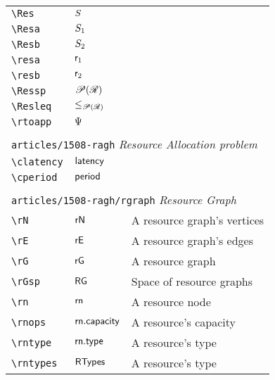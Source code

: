 \begin{longtable}{lll}
 {\color[rgb]{0.5,0.5,0.5}\texttt{\textbackslash Res}} & $S$ & \\ 
 {\color[rgb]{0.5,0.5,0.5}\texttt{\textbackslash Resa}} & $S_1$ & \\ 
 {\color[rgb]{0.5,0.5,0.5}\texttt{\textbackslash Resb}} & $S_2$ & \\ 
 {\color[rgb]{0.5,0.5,0.5}\texttt{\textbackslash resa}} & $\mathsf{r}_1$ & \\ 
 {\color[rgb]{0.5,0.5,0.5}\texttt{\textbackslash resb}} & $\mathsf{r}_2$ & \\ 
 {\color[rgb]{0.5,0.5,0.5}\texttt{\textbackslash Ressp}} & $\mathscr{P}(\mathscr{R})$ & \\ 
 {\color[rgb]{0.5,0.5,0.5}\texttt{\textbackslash Resleq}} & $\leq_{\mathscr{P}(\mathscr{R})}$ & \\ 
 {\color[rgb]{0.5,0.5,0.5}\texttt{\textbackslash rtoapp}} & $\Psi$ & \\ 
  &  & \\ 
 \multicolumn{3}{l}{{\color[rgb]{0.5,0.5,0.5}\texttt{articles/1508-ragh}} \emph{Resource Allocation problem}}\\ 
 \hline
{\color[rgb]{0.5,0.5,0.5}\texttt{\textbackslash clatency}} & $\mathsf{latency}$ & \\ 
 {\color[rgb]{0.5,0.5,0.5}\texttt{\textbackslash cperiod}} & $\mathsf{period}$ & \\ 
  &  & \\ 
 \multicolumn{3}{l}{{\color[rgb]{0.5,0.5,0.5}\texttt{articles/1508-ragh/rgraph}} \emph{Resource Graph}}\\ 
 \hline
{\color[rgb]{0.5,0.5,0.5}\texttt{\textbackslash rN}} & $\mathsf{rN}$ &  A resource graph's vertices\\ 
 {\color[rgb]{0.5,0.5,0.5}\texttt{\textbackslash rE}} & $\mathsf{rE}$ &  A resource graph's edges\\ 
 {\color[rgb]{0.5,0.5,0.5}\texttt{\textbackslash rG}} & $\mathsf{rG}$ &  A resource graph\\ 
 {\color[rgb]{0.5,0.5,0.5}\texttt{\textbackslash rGsp}} & $\mathsf{RG}$ &  Space of resource graphs\\ 
 {\color[rgb]{0.5,0.5,0.5}\texttt{\textbackslash rn}} & $\mathsf{rn}$ &  A resource node\\ 
 {\color[rgb]{0.5,0.5,0.5}\texttt{\textbackslash rnops}} & $\mathsf{rn.capacity}$ &  A resource's capacity\\ 
 {\color[rgb]{0.5,0.5,0.5}\texttt{\textbackslash rntype}} & $\mathsf{rn.type}$ &  A resource's type\\ 
 {\color[rgb]{0.5,0.5,0.5}\texttt{\textbackslash rntypes}} & $\mathsf{RTypes}$ &  A resource's type\\ 

\end{longtable}
